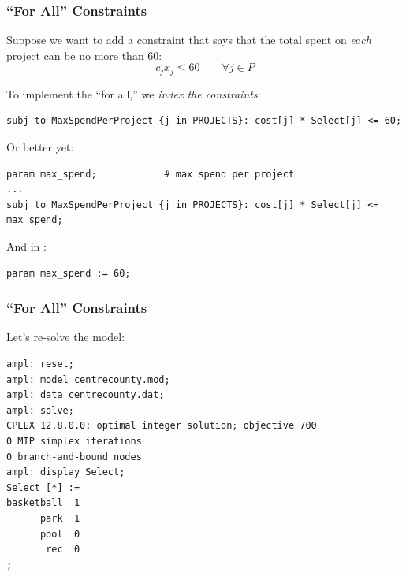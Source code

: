 \begin{frame}[fragile]

	\frametitle{``For All'' Constraints}
	
	\bit
	\item Suppose we want to add a constraint that says that the total spent on {\em each} project can be no more than 60:
		\[ c_j x_j \le 60 \qquad \forall j\in P \]
	\item To implement the ``for all,'' we {\em index the constraints}:
	\eit	
	
\begin{lstlisting}
subj to MaxSpendPerProject {j in PROJECTS}: cost[j] * Select[j] <= 60;
\end{lstlisting}
	
	\pause
	
	\bit
	\item Or better yet:
	\eit
	
\begin{lstlisting}
param max_spend;			# max spend per project
...
subj to MaxSpendPerProject {j in PROJECTS}: cost[j] * Select[j] <= max_spend;
\end{lstlisting}

	\bit
	\item And in :
	\eit

\begin{lstlisting}
param max_spend := 60;
\end{lstlisting}
	
\end{frame}

\begin{frame}[fragile]

	\frametitle{``For All'' Constraints}
	
	\bit
	\item Let's re-solve the model:
	\eit	
	
\begin{lstlisting}
ampl: reset;
ampl: model centrecounty.mod;
ampl: data centrecounty.dat;
ampl: solve;
CPLEX 12.8.0.0: optimal integer solution; objective 700
0 MIP simplex iterations
0 branch-and-bound nodes
ampl: display Select;
Select [*] :=
basketball  1
      park  1
      pool  0
       rec  0
;
\end{lstlisting}
	
\end{frame}





